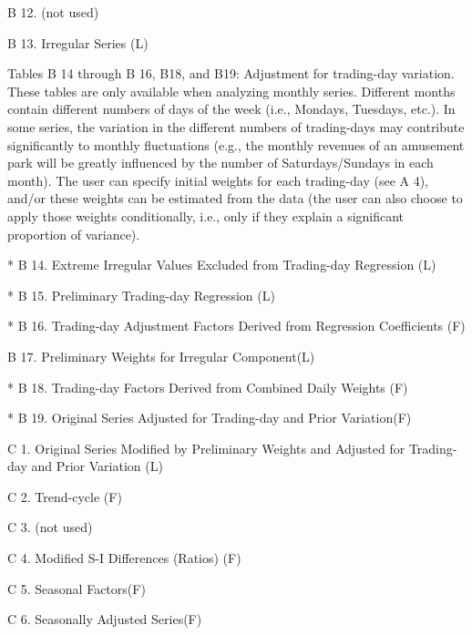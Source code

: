 B 12. (not used)
 



B 13. Irregular Series (L) 
 



Tables B 14 through B 16, B18, and B19: Adjustment for trading-day variation. These tables are only available when analyzing monthly series. Different months contain different numbers of days of the week (i.e., Mondays, Tuesdays, etc.). In some series, the variation in the different numbers of trading-days may contribute significantly to monthly fluctuations (e.g., the monthly revenues of an amusement park will be greatly influenced by the number of Saturdays/Sundays in each month). The user can specify initial weights for each trading-day (see A 4), and/or these weights can be estimated from the data (the user can also choose to apply those weights conditionally, i.e., only if they explain a significant proportion of variance).
 



* B 14. Extreme Irregular Values Excluded from Trading-day Regression (L) 
 



* B 15. Preliminary Trading-day Regression (L) 
 



* B 16. Trading-day Adjustment Factors Derived from Regression Coefficients (F) 
 



B 17. Preliminary Weights for Irregular Component(L) 
 



* B 18. Trading-day Factors Derived from Combined Daily Weights (F) 
 



* B 19. Original Series Adjusted for Trading-day and Prior Variation(F) 
 



C 1. Original Series Modified by Preliminary Weights and Adjusted for Trading-day and Prior Variation (L) 
 



C 2. Trend-cycle (F) 
 



C 3. (not used)
 



C 4. Modified S-I Differences (Ratios) (F) 
 



C 5. Seasonal Factors(F) 
 



C 6. Seasonally Adjusted Series(F) 
 



